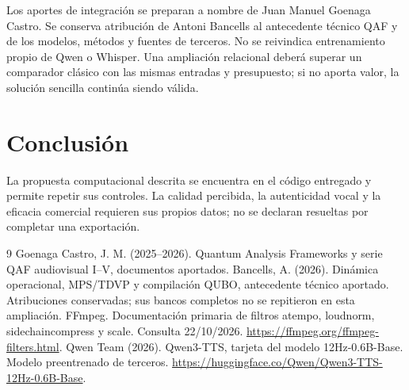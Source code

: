 \documentclass[10pt,a4paper]{article}
\begin{document}
Los aportes de integración se preparan a nombre de Juan Manuel Goenaga Castro. Se conserva atribución de Antoni Bancells al antecedente técnico QAF y de los modelos, métodos y fuentes de terceros. No se reivindica entrenamiento propio de Qwen o Whisper. Una ampliación relacional deberá superar un comparador clásico con las mismas entradas y presupuesto; si no aporta valor, la solución sencilla continúa siendo válida.
\section{Conclusión}
La propuesta computacional descrita se encuentra en el código entregado y permite repetir sus controles. La calidad percibida, la autenticidad vocal y la eficacia comercial requieren sus propios datos; no se declaran resueltas por completar una exportación.
\begin{thebibliography}{9}
 Goenaga Castro, J. M. (2025--2026). Quantum Analysis Frameworks y serie QAF audiovisual I--V, documentos aportados. Bancells, A. (2026). Dinámica operacional, MPS/TDVP y compilación QUBO, antecedente técnico aportado. Atribuciones conservadas; sus bancos completos no se repitieron en esta ampliación.
 FFmpeg. Documentación primaria de filtros atempo, loudnorm, sidechaincompress y scale. Consulta 22/10/2026. \url{https://ffmpeg.org/ffmpeg-filters.html}.
 Qwen Team (2026). Qwen3-TTS, tarjeta del modelo 12Hz-0.6B-Base. Modelo preentrenado de terceros. \url{https://huggingface.co/Qwen/Qwen3-TTS-12Hz-0.6B-Base}.
\end{thebibliography}
\end{document}
